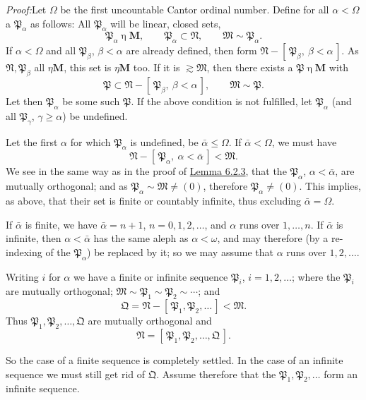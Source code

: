 \documentclass[12pt,b5paper,twoside]{article}
\newcommand{\M}{\mathbf M}
\newcommand{\clos}[1]{[\,#1\,]}
\newcommand{\Proof}{\par\noindent\textit{Proof:}\enspace}
\newcommand{\lemref}[1]{\hyperref[lem:#1]{Lemma #1}}
\begin{document}
\Proof Let \(\Omega\) be the first uncountable Cantor ordinal number. Define
for all \(\alpha<\Omega\) a \(\mathfrak P_\alpha\) as follows: All
\(\mathfrak P_\alpha\) will be linear, closed sets,
\[
 \mathfrak P_\alpha\mathbin{\eta}\M,
 \qquad \mathfrak P_\alpha\subset\mathfrak N,
 \qquad \mathfrak M\sim\mathfrak P_\alpha.
\]
If \(\alpha<\Omega\) and all \(\mathfrak P_\beta\), \(\beta<\alpha\) are
already defined, then form
\(\mathfrak N-\clos{\mathfrak P_\beta,\ \beta<\alpha}\). As
\(\mathfrak N,\mathfrak P_\beta\) all \(\mathbin{\eta}\M\), this set is
\(\mathbin{\eta}\M\) too. If it is \(\gtrsim\mathfrak M\), then there
exists a \(\mathfrak P\mathbin{\eta}\M\) with
\[
 \mathfrak P\subset
 \mathfrak N-\clos{\mathfrak P_\beta,\ \beta<\alpha},
 \qquad \mathfrak M\sim\mathfrak P.
\]
Let then \(\mathfrak P_\alpha\) be some such \(\mathfrak P\). If the above
condition is not fulfilled, let \(\mathfrak P_\alpha\) (and all
\(\mathfrak P_\gamma\), \(\gamma\geq\alpha\)) be undefined.

Let the first \(\alpha\) for which \(\mathfrak P_\alpha\) is undefined, be
\(\bar\alpha\leq\Omega\). If \(\bar\alpha<\Omega\), we must have
\[
 \mathfrak N-\clos{\mathfrak P_\alpha,\ \alpha<\bar\alpha}<\mathfrak M.
\]
We see in the same way as in the proof of \lemref{6.2.3}, that the
\(\mathfrak P_\alpha\), \(\alpha<\bar\alpha\), are mutually orthogonal; and
as \(\mathfrak P_\alpha\sim\mathfrak M\ne(0)\), therefore
\(\mathfrak P_\alpha\ne(0)\). This implies, as above, that their set is finite
or countably infinite, thus excluding \(\bar\alpha=\Omega\).

If \(\bar\alpha\) is finite, we have \(\bar\alpha=n+1\),
\(n=0,1,2,\ldots\), and \(\alpha\) runs over \(1,\ldots,n\). If
\(\bar\alpha\) is infinite, then \(\alpha<\bar\alpha\) has the same aleph as
\(\alpha<\omega\), and may therefore (by a re-indexing of the
\(\mathfrak P_\alpha\)) be replaced by it; so we may assume that \(\alpha\)
runs over \(1,2,\ldots\).

Writing \(i\) for \(\alpha\) we have a finite or infinite sequence
\(\mathfrak P_i\), \(i=1,2,\ldots\); where the \(\mathfrak P_i\) are mutually
orthogonal; \(\mathfrak M\sim\mathfrak P_1\sim\mathfrak P_2\sim\cdots\);
and
\[
 \mathfrak Q=\mathfrak N-\clos{\mathfrak P_1,\mathfrak P_2,\ldots}
 <\mathfrak M.
\]
Thus \(\mathfrak P_1,\mathfrak P_2,\ldots,\mathfrak Q\) are mutually
orthogonal and
\[
 \mathfrak N=\clos{\mathfrak P_1,\mathfrak P_2,\ldots,\mathfrak Q}.
\]

So the case of a finite sequence is completely settled. In the case of an
infinite sequence we must still get rid of \(\mathfrak Q\). Assume therefore
that the \(\mathfrak P_1,\mathfrak P_2,\ldots\) form an infinite sequence.
\end{document}
